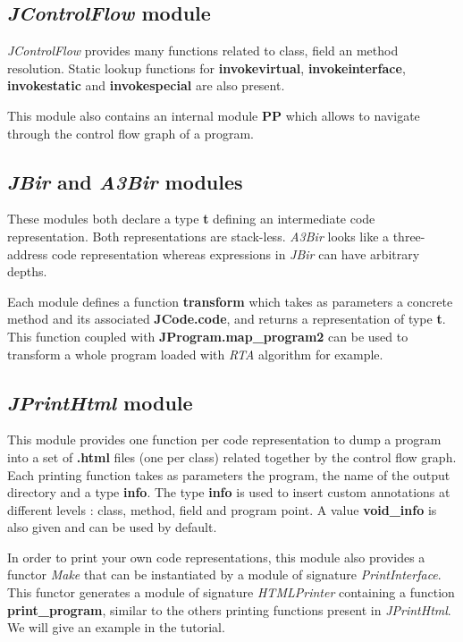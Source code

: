\documentclass{article}
\begin{document}
\subsection{\emph{JControlFlow} module}

\emph{JControlFlow} provides many functions related to class, field
an method resolution. Static lookup functions for
\textbf{invokevirtual}, \textbf{invokeinterface},
\textbf{invokestatic} and \textbf{invokespecial} are also present.

This module also contains an internal module \textbf{PP} which
allows to navigate through the control flow graph of a program.

\subsection{\emph{JBir} and \emph{A3Bir} modules}

These modules both declare a type \textbf{t} defining an
intermediate code representation. Both representations are
stack-less. \emph{A3Bir} looks like a three-address code
representation whereas expressions in \emph{JBir} can have
arbitrary depths.

Each module defines a function \textbf{transform} which takes as
parameters a concrete method and its associated
\textbf{JCode.code}, and returns a representation of type
\textbf{t}. This function coupled with
\textbf{JProgram.map\_program2} can be used to transform a whole
program loaded with \emph{RTA} algorithm for example.

\subsection{\emph{JPrintHtml} module}

This module provides one function per code representation to dump a
program into a set of \textbf{.html} files (one per class) related
together by the control flow graph. Each printing function takes as
parameters the program, the name of the output directory and a type
\textbf{info}. The type \textbf{info} is used to insert custom
annotations at different levels : class, method, field and program
point. A value \textbf{void\_info} is also given and can be used by
default.

In order to print your own code representations, this module also
provides a functor \emph{Make} that can be instantiated by a module
of signature \emph{PrintInterface}. This functor generates a module
of signature \emph{HTMLPrinter} containing a function
\textbf{print\_program}, similar to the others printing functions
present in \emph{JPrintHtml}. We will give an example in the
tutorial.
\end{document}

